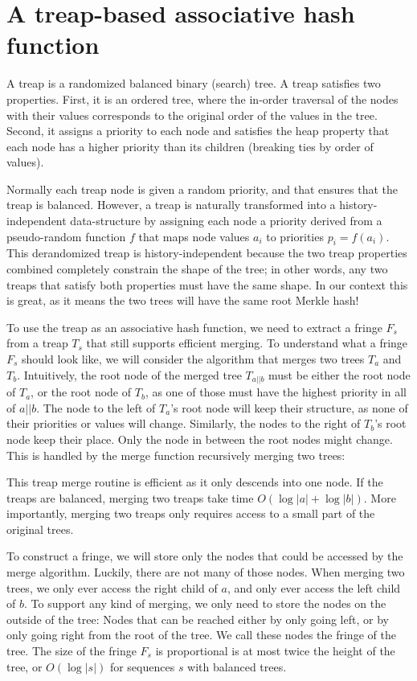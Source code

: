 \section{A treap-based associative hash function}
\label{s:treap}

A treap is a randomized balanced binary (search) tree. A treap satisfies two
properties.  First, it is an ordered tree, where the in-order traversal of the
nodes with their values corresponds to the original order of the values in the
tree. Second, it assigns a priority to each node and satisfies the heap
property that each node has a higher priority than its children (breaking ties
by order of values).

Normally each treap node is given a random priority, and that ensures that the
treap is balanced. However, a treap is naturally transformed into a
history-independent data-structure by assigning each node a priority derived
from a pseudo-random function $f$ that maps node values $a_i$ to priorities
$p_i = f(a_i)$. This derandomized treap is history-independent because the two
treap properties combined completely constrain the shape of the tree; in other
words, any two treaps that satisfy both properties must have the same shape. In
our context this is great, as it means the two trees will have the same root
Merkle hash!

To use the treap as an associative hash function, we need to extract a fringe $F_s$
from a treap $T_s$ that still supports efficient merging. To understand what a
fringe $F_s$ should look like, we will consider the algorithm that merges two
trees $T_a$ and $T_b$. Intuitively, the root node of the merged tree $T_{a||b}$
must be either the root node of $T_a$, or the root node of $T_b$, as one of those
must have the highest priority in all of $a||b$. The node to the left of $T_a$'s
root node will keep their structure, as none of their priorities or values will change.
Similarly, the nodes to the right of $T_b$'s root node keep their place. Only
the node in between the root nodes might change. This is handled by the merge function
recursively merging two trees:



This treap merge routine is efficient as it only descends into one node. If
the treaps are balanced, merging two treaps take time $O(\log |a| + \log |b|)$.
More importantly, merging two treaps only requires access to a small part of
the original trees. 

To construct a fringe, we will store only the nodes that could be accessed by
the merge algorithm. Luckily, there are not many of those nodes.  When merging
two trees, we only ever access the right child of $a$, and only ever access the
left child of $b$. To support any kind of merging, we only need to store the
nodes on the outside of the tree: Nodes that can be reached either by only
going left, or by only going right from the root of the tree. We call these
nodes the fringe of the tree.  The size of the fringe $F_s$ is
proportional is at most twice the height of the tree, or $O(\log |s|)$ for
sequences $s$ with balanced trees.

